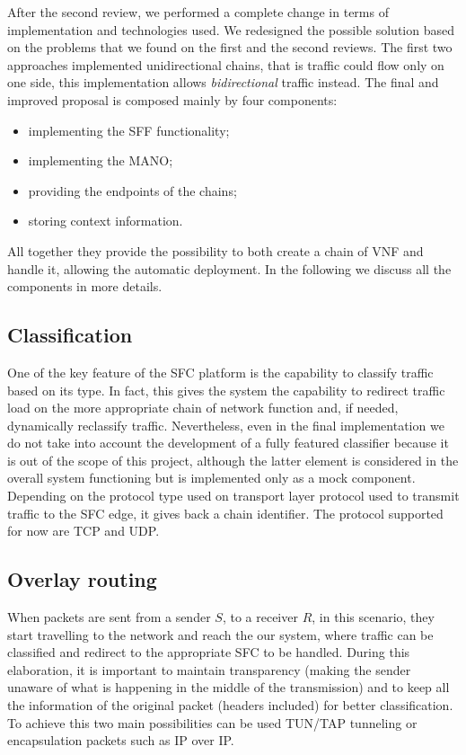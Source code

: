 After the second review, we performed a complete change in terms of
implementation and technologies used. We redesigned the possible solution based
on the problems that we found on the first and the second reviews. The first two
approaches implemented unidirectional chains, that is traffic could flow only on
one side, this implementation
allows \emph{bidirectional} traffic instead. 
The final and improved proposal is composed mainly by four components:
\begin{itemize}
  \item \astaire{} implementing the SFF functionality;
  \item \harbor{} implementing the MANO;
  \item \ironhide{} providing the endpoints of the chains;
  \item \roulette{} storing context information.
\end{itemize}
All together they provide the possibility to both create a chain of VNF and
handle it, allowing the automatic deployment. In the following we discuss all
the components in more details.

\subsection{Classification}
One of the key feature of the SFC platform is the capability to classify
traffic based on its type. In fact, this gives the system the capability to
redirect traffic load on the more appropriate chain of network function and, if
needed, dynamically reclassify traffic. Nevertheless, even in the
final implementation we do not take into account the development of a fully
featured classifier because it is out of the scope of this project, although the
latter element is considered in the overall system functioning but is
implemented only as a mock component. Depending on the protocol type used on
transport layer protocol used to transmit traffic to the SFC edge, it gives back
a chain identifier. The protocol supported for now are TCP and UDP.

\subsection{Overlay routing}
When packets are sent from a sender $S$, to a receiver $R$, in this scenario,
they start travelling to the network and reach the our system, where traffic can
be classified and redirect to the appropriate SFC to be handled. During this
elaboration, it is important to maintain transparency (making the sender unaware
of what is happening in the middle of the transmission) and to keep all the
information of the original packet (headers included) for better classification.
To achieve this two main possibilities can be used TUN/TAP tunneling or
encapsulation packets such as IP over IP.

